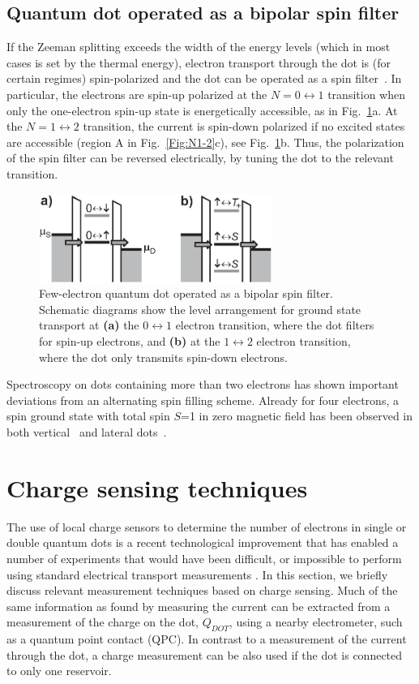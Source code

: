 \documentclass[12pt,aps,nofootinbib]{revtex4-1}
\begin{document}
\subsection{Quantum dot operated as a bipolar spin filter}
If the Zeeman splitting exceeds the width of the energy levels
(which in most cases is set by the thermal energy), electron
transport through the dot is (for certain regimes) spin-polarized
and the dot can be operated as a spin
filter~\cite{RecherPRL2000,HansonPRB2004}. In particular, the
electrons are spin-up polarized at the $N=0\leftrightarrow1$
transition when only the one-electron spin-up state is
energetically accessible, as in Fig.~\ref{fig:spinfilter}a. At the
$N=1\leftrightarrow2$ transition, the current is spin-down
polarized if no excited states are accessible (region A in
Fig.~\ref{Fig:N1-2}c), see Fig.~\ref{fig:spinfilter}b. Thus, the
polarization of the spin filter can be reversed electrically, by
tuning the dot to the relevant transition.

\begin{figure}[htb]
\includegraphics[width=3in]{hanson_fig10.eps}
\caption{Few-electron quantum dot operated as a bipolar spin
filter. Schematic diagrams show the level arrangement for ground
state transport at \textbf{(a)} the $0\leftrightarrow1$ electron
transition, where the dot filters for spin-up electrons, and
\textbf{(b)} at the $1\leftrightarrow2  $ electron transition,
where the dot only transmits spin-down electrons.}
\label{fig:spinfilter}
\end{figure}


Spectroscopy on dots containing more than two electrons has shown
important deviations from an alternating spin filling scheme.
Already for four electrons, a spin ground state with total spin
$S$=1 in zero magnetic field has been observed in both
vertical~\cite{kouwenhoven01} and lateral dots~\cite{BeverenNJP2005}.

\section{Charge sensing techniques}
\label{Section:ChargeSensing} \label{QPC} The use of local charge
sensors to determine the number of electrons in single or double
quantum dots is a recent technological improvement that has
enabled a number of experiments that would have been difficult, or
impossible to perform using standard electrical transport
measurements \cite{FieldPRL93}. In this section, we briefly
discuss relevant measurement techniques based on charge sensing.
Much of the same information as found by measuring the current can
be extracted from a measurement of the charge on the dot,
$Q_{DOT}$, using a nearby
electrometer, such as a quantum point contact (QPC).
In contrast to a measurement of the current through the dot, a charge
measurement can be also used if the dot is
connected to only one reservoir.
\end{document}
